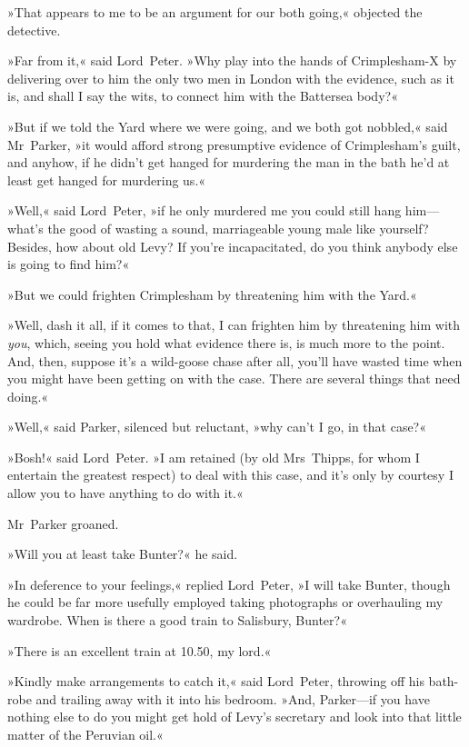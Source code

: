 »That appears to me to be an argument for our both going,« objected the detective.

»Far from it,« said Lord~Peter. »Why play into the hands of Crimplesham-X by delivering over to him the only two men in London with the evidence, such as it is, and shall I say the wits, to connect him with the Battersea body?«

»But if we told the Yard where we were going, and we both got nobbled,« said Mr~Parker, »it would afford strong presumptive evidence of Crimplesham's guilt, and anyhow, if he didn't get hanged for murdering the man in the bath he'd at least get hanged for murdering us.«

»Well,« said Lord~Peter, »if he only murdered me you could still hang him—what's the good of wasting a sound, marriageable young male like yourself? Besides, how about old Levy? If you're incapacitated, do you think anybody else is going to find him?«

»But we could frighten Crimplesham by threatening him with the Yard.«

»Well, dash it all, if it comes to that, I can frighten him by threatening him with \textit{you}, which, seeing you hold what evidence there is, is much more to the point. And, then, suppose it's a wild-goose chase after all, you'll have wasted time when you might have been getting on with the case. There are several things that need doing.«

»Well,« said Parker, silenced but reluctant, »why can't I go, in that case?«

»Bosh!« said Lord~Peter. »I am retained (by old Mrs~Thipps, for whom I entertain the greatest respect) to deal with this case, and it's only by courtesy I allow you to have anything to do with it.«

Mr~Parker groaned.

»Will you at least take Bunter?« he said.

»In deference to your feelings,« replied Lord~Peter, »I will take Bunter, though he could be far more usefully employed taking photographs or overhauling my wardrobe. When is there a good train to Salisbury, Bunter?«

»There is an excellent train at 10.50, my lord.«

»Kindly make arrangements to catch it,« said Lord~Peter, throwing off his bath-robe and trailing away with it into his bedroom. »And, Parker—if you have nothing else to do you might get hold of Levy's secretary and look into that little matter of the Peruvian oil.«

